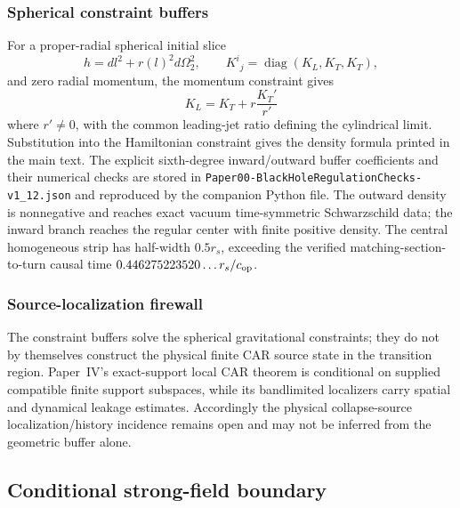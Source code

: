 \documentclass[12pt,a4paper]{article}
\begin{document}
\subsubsection{Spherical constraint buffers}
For a proper-radial spherical initial slice
\[
 h=dl^2+r(l)^2d\Omega_2^2,
 \qquad K^i{}_j=\operatorname{diag}(K_L,K_T,K_T),
\]
and zero radial momentum, the momentum constraint gives
\[
 K_L=K_T+r\frac{K_T'}{r'}
\]
where \(r'\ne0\), with the common leading-jet ratio defining the cylindrical
limit.  Substitution into the Hamiltonian constraint gives the density formula
printed in the main text.  The explicit sixth-degree inward/outward buffer
coefficients and their numerical checks are stored in
\texttt{Paper00-BlackHoleRegulationChecks-v1\_12.json} and reproduced by the
companion Python file.  The outward density is nonnegative and reaches exact
vacuum time-symmetric Schwarzschild data; the inward branch reaches the
regular center with finite positive density.  The central homogeneous strip
has half-width \(0.5r_s\), exceeding the verified matching-section-to-turn
causal time \(0.446275223520\ldots r_s/c_{\rm op}\).

\subsubsection{Source-localization firewall}
The constraint buffers solve the spherical gravitational constraints; they do
not by themselves construct the physical finite CAR source state in the
transition region.  Paper~IV's exact-support local CAR theorem is conditional
on supplied compatible finite support subspaces, while its bandlimited
localizers carry spatial and dynamical leakage estimates.  Accordingly the
physical collapse-source localization/history incidence remains open and may
not be inferred from the geometric buffer alone.




\subsection{Conditional strong-field boundary}
\label{p8:app:conditional-strong-field-boundary}
\end{document}
